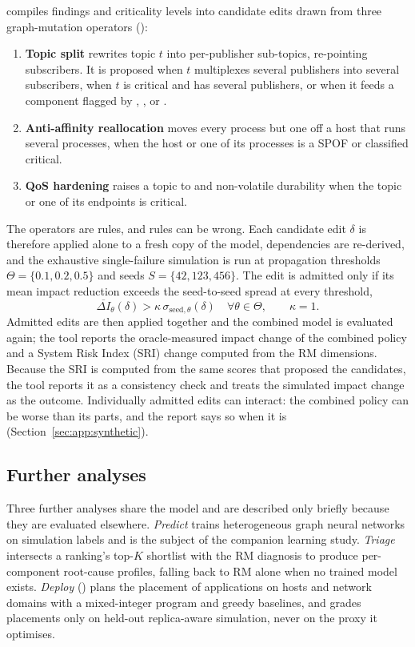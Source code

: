 compiles findings and criticality levels into candidate edits drawn from three graph-mutation operators ():
\begin{enumerate}\tightlist
  \item \textbf{Topic split} rewrites topic $t$ into per-publisher sub-topics, re-pointing subscribers. It is proposed when $t$ multiplexes several publishers into several subscribers, when $t$ is critical and has several publishers, or when it feeds a component flagged by , ,  or .
  \item \textbf{Anti-affinity reallocation} moves every process but one off a host that runs several processes, when the host or one of its processes is a SPOF or classified critical.
  \item \textbf{QoS hardening} raises a topic to  and non-volatile durability when the topic or one of its endpoints is critical.
\end{enumerate}
The operators are rules, and rules can be wrong. Each candidate edit $\delta$ is therefore applied alone to a fresh copy of the model, dependencies are re-derived, and the exhaustive single-failure simulation is run at propagation thresholds $\Theta = \{0.1, 0.2, 0.5\}$ and seeds $S = \{42, 123, 456\}$. The edit is admitted only if its mean impact reduction exceeds the seed-to-seed spread at every threshold,
\begin{equation}
\overline{\Delta I}_\theta(\delta) > \kappa\, \sigma_{\text{seed},\theta}(\delta) \quad \forall \theta \in \Theta, \qquad \kappa = 1.
\label{eq:accept}
\end{equation}
Admitted edits are then applied together and the combined model is evaluated again; the tool reports the oracle-measured impact change of the combined policy and a System Risk Index (SRI) change computed from the RM dimensions. Because the SRI is computed from the same scores that proposed the candidates, the tool reports it as a consistency check and treats the simulated impact change as the outcome. Individually admitted edits can interact: the combined policy can be worse than its parts, and the report says so when it is (Section~\ref{sec:app:synthetic}).

\subsection{Further analyses}
\label{sec:analyses:more}

Three further analyses share the model and are described only briefly because they are evaluated elsewhere. \emph{Predict} trains heterogeneous graph neural networks on simulation labels and is the subject of the companion learning study. \emph{Triage} intersects a ranking's top-$K$ shortlist with the RM diagnosis to produce per-component root-cause profiles, falling back to RM alone when no trained model exists. \emph{Deploy} () plans the placement of applications on hosts and network domains with a mixed-integer program and greedy baselines, and grades placements only on held-out replica-aware simulation, never on the proxy it optimises.
